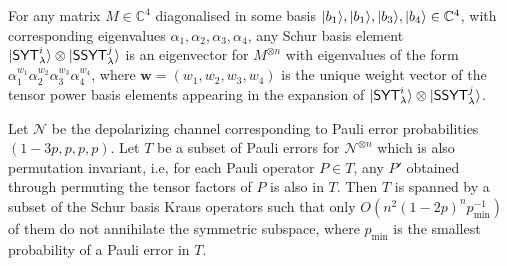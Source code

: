 \documentclass[11pt]{article}
\DeclarePairedDelimiter\ket{\lvert}{\rangle}
\begin{document}
\begin{corollary}\label{cor:probwtvector}
    For any matrix $M\in \mathbb C^4$ diagonalised in some basis $\ket{b_1},\ket{b_1},\ket{b_3},\ket{b_4}\in\mathbb C^4$, with corresponding eigenvalues $\alpha_1,\alpha_2, \alpha_3, \alpha_4$, any Schur basis element $\ket{\mathsf{SYT}^i_\lambda} \otimes \ket{\mathsf{SSYT}^j_\lambda}$ is an eigenvector for $M^{\otimes n}$ with eigenvalues of the form $\alpha_1^{w_1}\alpha_2^{w_2}\alpha_3^{w_3}\alpha_4^{w_4}$, where $\mathbf w=(w_1,w_2,w_3,w_4)$ is the unique weight vector of the tensor power basis elements appearing in the expansion of $\ket{\mathsf{SYT}^i_\lambda} \otimes \ket{\mathsf{SSYT}^j_\lambda}$.
\end{corollary}

\begin{lemma}\label{lem:rank}
Let $\mathcal N$ be the depolarizing channel corresponding to Pauli error probabilities $(1-3p,p,p,p)$. Let $T$ be a subset of Pauli errors for $\mathcal N^{\otimes n}$ which is also permutation invariant, i.e, for each Pauli operator $P \in T$, any $P'$ obtained through permuting the tensor factors of $P$ is also in $T$. Then $T$ is spanned by a subset of the Schur basis Kraus operators such that only $O(n^2(1-2p)^n p_{\min}^{-1})$ of them do not annihilate the symmetric subspace, where $p_{\min}$ is the smallest probability of a Pauli error in $T$.
\end{lemma}
\end{document}
